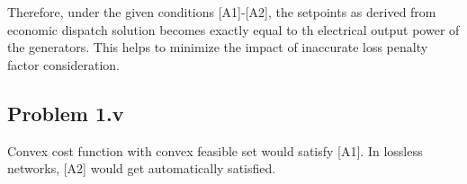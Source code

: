 Therefore, under the given conditions [A1]-[A2], the setpoints as derived from economic dispatch solution becomes exactly equal to th electrical output power of the generators. This helps to minimize the impact of inaccurate loss penalty factor consideration.
\subsection*{Problem 1.v}
Convex cost function with convex feasible set would satisfy [A1]. In lossless networks, [A2] would get automatically satisfied.